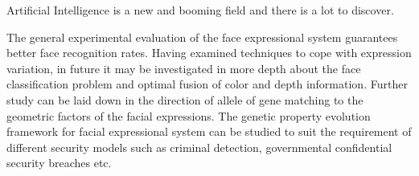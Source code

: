 Artificial Intelligence is a new and booming field and there is a lot to discover.

The general experimental evaluation of the face expressional
system guarantees better face recognition rates. Having examined techniques to cope with expression variation, in future it may be investigated in more depth about the face classification problem and optimal fusion of color and depth information. Further study can be laid down in the direction of allele of gene matching to the geometric factors of the facial expressions. The genetic property evolution framework for facial expressional system can be studied to suit the requirement of different security models such as criminal detection,
governmental confidential security breaches etc.